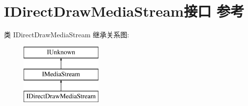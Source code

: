 \hypertarget{interface_i_direct_draw_media_stream}{}\section{I\+Direct\+Draw\+Media\+Stream接口 参考}
\label{interface_i_direct_draw_media_stream}
类 I\+Direct\+Draw\+Media\+Stream 继承关系图\+:\begin{figure}[H]
\begin{center}
\leavevmode
\includegraphics[height=3.000000cm]{interface_i_direct_draw_media_stream}
\end{center}
\end{figure}
